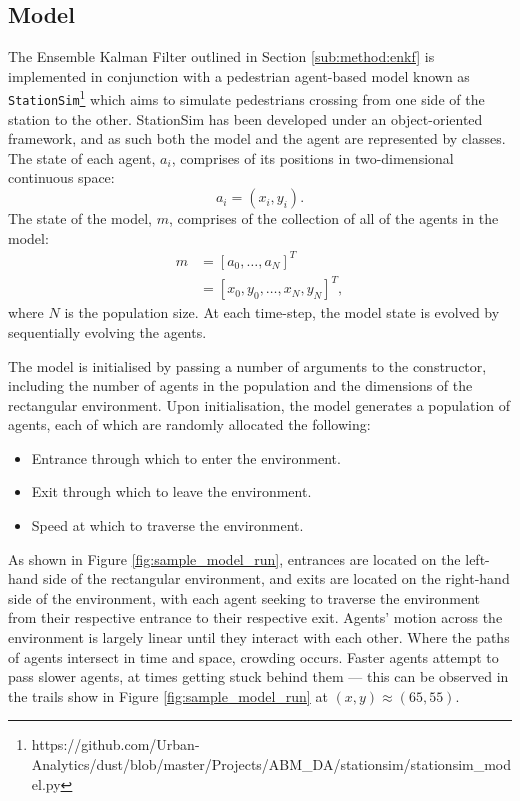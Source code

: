 \subsection{Model}\label{sub:research:model}

The Ensemble Kalman Filter outlined in Section \ref{sub:method:enkf} is
implemented in conjunction with a pedestrian agent-based model known as
\texttt{StationSim}\footnote{https://github.com/Urban-Analytics/dust/blob/master/Projects/ABM\_DA/stationsim/stationsim\_model.py}
which aims to simulate pedestrians crossing from one side of the station to the
other.
StationSim has been developed under an object-oriented framework, and as such
both the model and the agent are represented by classes.
The state of each agent, $a_i$, comprises of its positions in two-dimensional continuous space:
\begin{equation}
    a_i = \left( x_i , y_i \right).
\end{equation}
The state of the model, $m$, comprises of the collection of all of the agents in the
model:
\begin{align}
    m &= \left[ a_0 , \ldots , a_N \right]^T \nonumber \\
      &= \left[ x_0 , y_0 , \ldots , x_N , y_N \right]^T,
\end{align}
where $N$ is the population size.
At each time-step, the model state is evolved by sequentially evolving the
agents.

The model is initialised by passing a number of arguments to the constructor,
including the number of agents in the population and the dimensions of the
rectangular environment.
Upon initialisation, the model generates a population of agents, each of which
are randomly allocated the following:
\begin{itemize}
    \item Entrance through which to enter the environment.
    \item Exit through which to leave the environment.
    \item Speed at which to traverse the environment.
\end{itemize}
As shown in Figure \ref{fig:sample_model_run}, entrances are located on the
left-hand side of the rectangular environment, and exits are located on the
right-hand side of the environment, with each agent seeking to traverse the
environment from their respective entrance to their respective exit.
Agents' motion across the environment is largely linear until they interact with
each other.
Where the paths of agents intersect in time and space, crowding occurs.
Faster agents attempt to pass slower agents, at times getting stuck behind them
--- this can be observed in the trails show in Figure \ref{fig:sample_model_run}
at $(x, y) \approx (65, 55)$.

